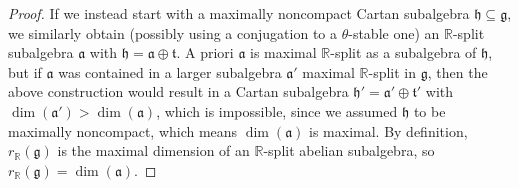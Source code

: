 \documentclass[12pt]{amsart}
\newcommand{\R}{\mathbb{R} }
\newcommand{\frakg}{\mathfrak{g}}
\newcommand{\fraka}{\mathfrak{a}}
\newcommand{\frakh}{\mathfrak{h}}
\newcommand{\frakt}{\mathfrak{t}}
\numberwithin{equation}{section}
\theoremstyle{remark} %
\begin{document}
\begin{proof}
	If we instead start with a maximally noncompact Cartan subalgebra $\frakh \subseteq \frakg$, we similarly obtain (possibly using a conjugation to a $\theta$-stable one) an $\R$-split subalgebra $\fraka$ with $\frakh = \fraka \oplus \frakt$. A priori $\fraka$ is maximal $\R$-split as a subalgebra of $\frakh$, but if $\fraka$ was contained in a larger subalgebra $\fraka'$ maximal $\R$-split in $\frakg$, then the above construction would result in a Cartan subalgebra $\frakh' = \fraka' \oplus \frakt'$ with $\dim(\fraka')>\dim(\fraka)$, which is impossible, since we assumed $\frakh$ to be maximally noncompact, which means $\dim(\fraka)$ is maximal. By definition, $r_\R(\frakg)$ is the maximal dimension of an $\R$-split abelian subalgebra, so $r_\R(\frakg) = \dim(\fraka)$.
\end{proof}
\end{document}
